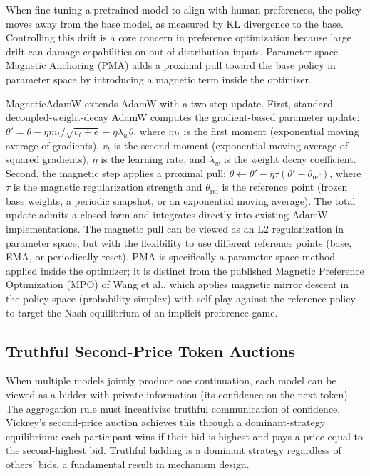 When fine-tuning a pretrained model to align with human preferences, the policy moves away from the base model, as measured by KL divergence to the base. Controlling this drift is a core concern in preference optimization because large drift can damage capabilities on out-of-distribution inputs. Parameter-space Magnetic Anchoring (PMA) adds a proximal pull toward the base policy in parameter space by introducing a magnetic term inside the optimizer.

MagneticAdamW extends AdamW with a two-step update. First, standard decoupled-weight-decay AdamW computes the gradient-based parameter update: $\theta' = \theta - \eta m_t / \sqrt{v_t + \epsilon} - \eta \lambda_w \theta$, where $m_t$ is the first moment (exponential moving average of gradients), $v_t$ is the second moment (exponential moving average of squared gradients), $\eta$ is the learning rate, and $\lambda_w$ is the weight decay coefficient. Second, the magnetic step applies a proximal pull: $\theta \leftarrow \theta' - \eta \tau (\theta' - \theta_\text{ref})$, where $\tau$ is the magnetic regularization strength and $\theta_\text{ref}$ is the reference point (frozen base weights, a periodic snapshot, or an exponential moving average). The total update admits a closed form and integrates directly into existing AdamW implementations. The magnetic pull can be viewed as an L2 regularization in parameter space, but with the flexibility to use different reference points (base, EMA, or periodically reset). PMA is specifically a parameter-space method applied inside the optimizer; it is distinct from the published Magnetic Preference Optimization (MPO) of Wang et al., which applies magnetic mirror descent in the policy space (probability simplex) with self-play against the reference policy to target the Nash equilibrium of an implicit preference game.

\subsection*{Truthful Second-Price Token Auctions}

When multiple models jointly produce one continuation, each model can be viewed as a bidder with private information (its confidence on the next token). The aggregation rule must incentivize truthful communication of confidence. Vickrey's second-price auction achieves this through a dominant-strategy equilibrium: each participant wins if their bid is highest and pays a price equal to the second-highest bid. Truthful bidding is a dominant strategy regardless of others' bids, a fundamental result in mechanism design.

